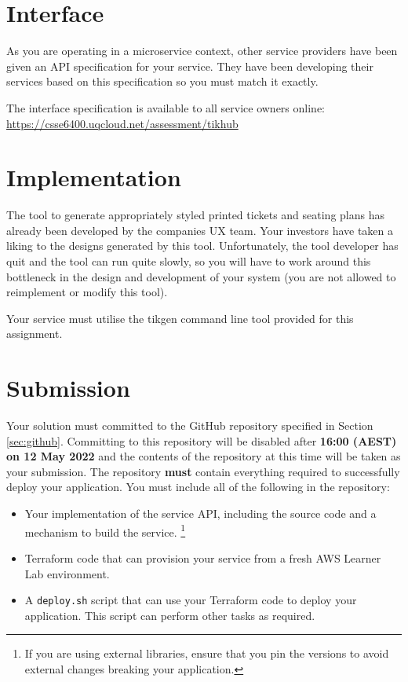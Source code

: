 \documentclass{csse4400}
\begin{document}
\section{Interface}
As you are operating in a microservice context,
other service providers have been given an API specification for your service.
They have been developing their services based on this specification so you must match it exactly.

The interface specification is available to all service owners online:
\url{https://csse6400.uqcloud.net/assessment/tikhub}

\section{Implementation}
The tool to generate appropriately styled printed tickets and seating plans has already been developed by the companies UX team.
Your investors have taken a liking to the designs generated by this tool.
Unfortunately, the tool developer has quit and the tool can run quite slowly,
so you will have to work around this bottleneck in the design and development of your system (you are not allowed to reimplement or modify this tool).

Your service must utilise the tikgen command line tool provided for this assignment.

\section{Submission}
Your solution must committed to the GitHub repository specified in Section \ref{sec:github}.
Committing to this repository will be disabled after \textbf{16:00 (AEST) on 12 May 2022} and the contents of the repository at this time will be taken as your submission.
The repository \textbf{must} contain everything required to successfully deploy your application.
You must include all of the following in the repository:
\begin{itemize}
  \item Your implementation of the service API, including the source code and a mechanism to build the service.%
  \footnote{If you are using external libraries, ensure that you pin the versions to avoid external changes breaking your application.}
  \item Terraform code that can provision your service from a fresh AWS Learner Lab environment.
  \item A \texttt{deploy.sh} script that can use your Terraform code to deploy your application.
    This script can perform other tasks as required.
\end{itemize}
\end{document}
